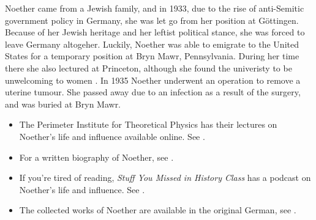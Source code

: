 \documentclass[../../../include/open-logic-section]{subfiles}
\begin{document}
Noether came from a Jewish family, and in 1933, due to the rise of
anti-Semitic government policy in Germany, she was let go from her position
at G\"{o}ttingen. Because of her Jewish heritage and her leftist political
stance, she was forced to leave Germany altogeher. Luckily, Noether was
able to emigrate to the United States for a temporary position at Bryn
Mawr, Pennsylvania. During her time there she also lectured at Princeton,
although she found the univeristy to be unwelcoming to women
\citep[81]{Dick1981}. In 1935 Noether underwent an operation to remove a
uterine tumour. She passed away due to an infection as a result of the
surgery, and was buried at Bryn Mawr.

\begin{reading} 
\begin{itemize} 
\item The Perimeter Institute for
Theoretical Physics has their lectures on Noether's life and influence
available online. See \citet{Perimeter2015}.

\item For a written biography of Noether, see \citet{Dick1981}.

\item If you're tired of reading, \emph{Stuff You Missed in History Class}
has a podcast on Noether's life and influence. See \citet{Frey2015}.

\item The collected works of Noether are available in the original German,
see \citet{Noether1983}. 
\end{itemize} 
\end{reading}
\end{document}
